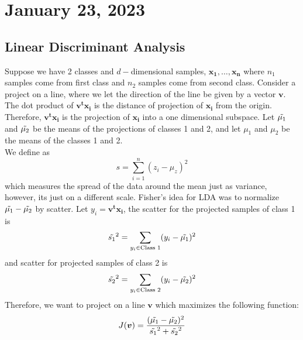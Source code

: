 \newpage
\section{January 23, 2023}
\subsection{Linear Discriminant Analysis}
Suppose we have 2 classes and  $d-$dimensional samples, $\boldsymbol{x_1, \dots, x_n}$ where $n_1$ samples come from first class and $n_2$ samples come from second class. 
Consider a project on a line, where we let the direction of the line be given by a vector
$\boldsymbol{v}$. The dot product of $\boldsymbol{v^tx_i}$ is the distance of projection 
of $\boldsymbol{x_i}$ from the origin. Therefore, $\boldsymbol{v^tx_i}$ is the projection of $\boldsymbol{x_i}$ into a one dimensional subspace.
Let  $\Tilde{\mu_1}$ and $\Tilde{\mu_2}$ be the means of the projections of classes 1 and 2, and let $\mu_1$ and $\mu_2$ be the means of the classes 1 and 2.
\\
We define  as 
$$
s = \sum_{i=1}^{n} (z_i - \mu_z)^2
$$
which measures the spread of the data around the mean just as variance, however, its just on a different scale. 
Fisher's idea for LDA was to normalize $\Tilde{\mu_1} - \Tilde{\mu_2}$ by scatter. 
Let $y_i = \boldsymbol{v^tx_i}$, the scatter for the projected samples of class 1 is 
$$
\Tilde{s_1}^2 =\sum_{y_i \in \text{Class 1}}(y_i - \Tilde{\mu_1})^2 
$$
and scatter for projected samples of class 2 is
$$
\Tilde{s_2}^2 =\sum_{y_i \in \text{Class 2}}(y_i - \Tilde{\mu_2})^2 
$$
Therefore, we want to project on a line $\boldsymbol{v}$ which maximizes the following function:
$$
J(\boldsymbol{v}) = \frac{(\Tilde{\mu_1} - \Tilde{\mu_2})^2}{\Tilde{s_1}^2  + \Tilde{s_2}^2}
$$